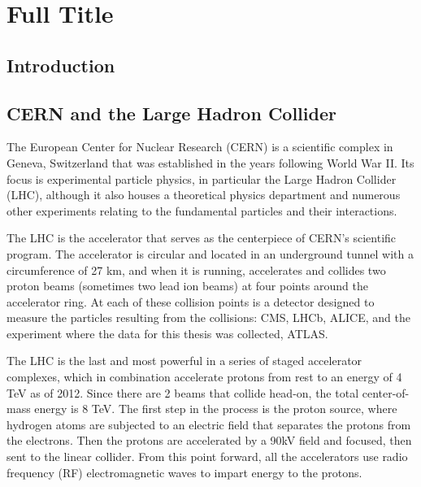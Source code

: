  

\chapter[ATLASDetector]{Full Title}

\section{Introduction}

\section{CERN and the Large Hadron Collider}
The European Center for Nuclear Research (CERN) is a scientific complex in Geneva, Switzerland that was established in the years following World War II.  Its focus is experimental particle physics, in particular the Large Hadron Collider (LHC), although it also houses a theoretical physics department and numerous other experiments relating to the fundamental particles and their interactions.  

The LHC is the accelerator that serves as the centerpiece of CERN's scientific program.  The accelerator is circular and located in an underground tunnel with a circumference of 27 km, and when it is running, accelerates and collides two proton beams (sometimes two lead ion beams) at four points around the accelerator ring.  At each of these collision points is a detector designed to measure the particles resulting from the collisions: CMS, LHCb, ALICE, and the experiment where the data for this thesis was collected, ATLAS.

The LHC is the last and most powerful in a series of staged accelerator complexes, which in combination accelerate protons from rest to an energy of 4 TeV as of 2012.  Since there are 2 beams that collide head-on, the total center-of-mass energy is 8 TeV.  The first step in the process is the proton source, where hydrogen atoms are subjected to an electric field that separates the protons from the electrons.  Then the protons are accelerated by a 90kV field and focused, then sent to the linear collider.  From this point forward, all the accelerators use radio frequency (RF) electromagnetic waves to impart energy to the protons.  

